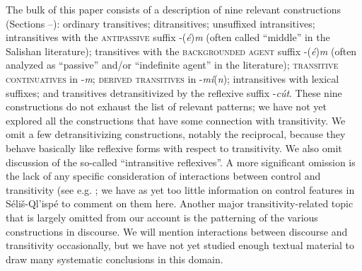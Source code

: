 \documentclass[output=paper,colorlinks,citecolor=brown]{langscibook}
\begin{document}
  The bulk of this paper consists of a description of nine relevant
  constructions (Sections --): ordinary transitives; ditransitives;
  unsuffixed intransitives; intransitives with the
  \textsc{antipassive} suffix -(\emph{\'e})\emph{m} (often called
  ``middle'' in the Salishan literature); transitives with the
  \textsc{backgrounded agent} suffix -(\emph{\'e})\emph{m} (often
  analyzed as ``passive'' and/or ``indefinite agent'' in the
  literature); \textsc{transitive continuatives} in -\emph{m};
  \textsc{derived transitives} in -\emph{m\'i}(\emph{n});
  intransitives with lexical suffixes; and transitives
  detransitivized by the reflexive suffix -\emph{c\'ut}.  These nine
  constructions do not exhaust the list of relevant patterns; we have
  not yet explored all the constructions that have some connection
  with transitivity.  We omit a few detransitivizing constructions,
  notably the reciprocal, because they behave basically like
  reflexive forms with respect to transitivity.  We also omit
  discussion of the so-called ``intransitive reflexives''.  A more
  significant omission is the lack of any specific consideration of
  interactions between control and transitivity (see
  e.g. \citealt{Thompson:1985}; we have as yet too little information
  on control features in S\'eli\v{s}-Ql'isp\'e to comment on them
  here.  Another major transitivity-related topic that is largely
  omitted from our account is the patterning of the various
  constructions in discourse.  We will mention interactions between
  discourse and transitivity occasionally, but we have not yet
  studied enough textual material to draw many systematic conclusions
  in this domain.
\end{document}
